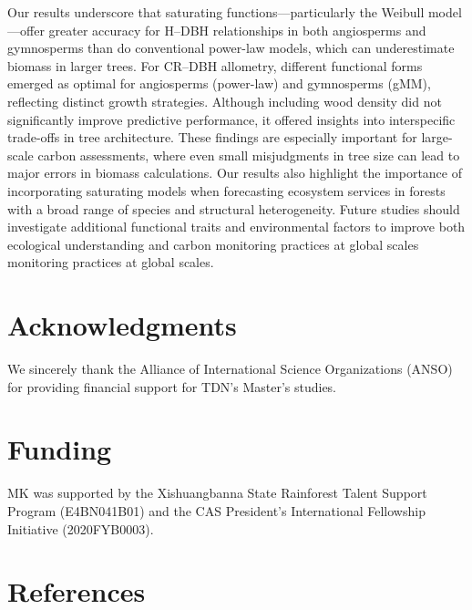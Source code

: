 \documentclass[
  12pt,
  letterpaper,
  DIV=11,
  numbers=noendperiod]{scrartcl}
\begin{document}
Our results underscore that saturating functions---particularly the
Weibull model---offer greater accuracy for H--DBH relationships in both
angiosperms and gymnosperms than do conventional power-law models, which
can underestimate biomass in larger trees. For CR--DBH allometry,
different functional forms emerged as optimal for angiosperms
(power-law) and gymnosperms (gMM), reflecting distinct growth
strategies. Although including wood density did not significantly
improve predictive performance, it offered insights into interspecific
trade-offs in tree architecture. These findings are especially important
for large-scale carbon assessments, where even small misjudgments in
tree size can lead to major errors in biomass calculations. Our results
also highlight the importance of incorporating saturating models when
forecasting ecosystem services in forests with a broad range of species
and structural heterogeneity. Future studies should investigate
additional functional traits and environmental factors to improve both
ecological understanding and carbon monitoring practices at global
scales monitoring practices at global scales.

\newpage

\section*{Acknowledgments}\label{acknowledgments}

We sincerely thank the Alliance of International Science Organizations
(ANSO) for providing financial support for TDN's Master's studies.

\section*{Funding}\label{funding}

MK was supported by the Xishuangbanna State Rainforest Talent Support
Program (E4BN041B01) and the CAS President's International Fellowship
Initiative (2020FYB0003).

\newpage

\section*{References}\label{references}
\end{document}

